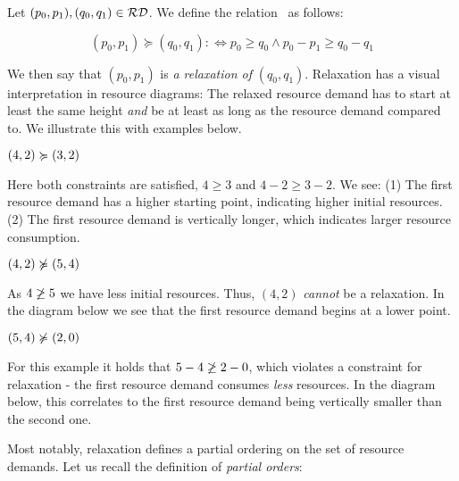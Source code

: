 \begin{definition}[Relaxation]\label{def:relaxation}
   Let \((p_0, p_1), (q_0, q_1) \in \mathcal{RD}\). We define the relation \relaxation ~as follows:

   \[
      (p_0, p_1) \succcurlyeq (q_0, q_1) :\iff p_0 \geq q_0 \wedge p_0 - p_1 \geq q_0 - q_1
   \]
\end{definition}

We then say that \((p_0, p_1)\) is \emph{a relaxation of} \((q_0, q_1)\). Relaxation has a visual interpretation in resource diagrams: The relaxed resource demand has to start at least the same height \emph{and} be at least as long as the resource demand compared to. We illustrate this with examples below.

\begin{example}
   \((4, 2) \succcurlyeq (3, 2)\)

Here both constraints are satisfied, \(4 \geq 3\) and \(4 - 2 \geq 3 - 2\). We see: (1) The first resource demand has a higher starting point, indicating higher initial resources. (2) The first resource demand is vertically longer, which indicates larger resource consumption.


\end{example}

\begin{example}
   \((4,2) \notrelaxation (5, 4)\)

As \(4 \centernot{\geq} 5\) we have less initial resources. Thus, \((4,2)\) \emph{cannot} be a relaxation. In the diagram below we see that the first resource demand begins at a lower point.


\end{example}

\begin{example}
   \((5, 4) \notrelaxation (2, 0)\)

For this example it holds that \(5 - 4 \centernot{\geq} 2 - 0\), which violates a constraint for relaxation - the first resource demand consumes \emph{less} resources. In the diagram below, this correlates to the first resource demand being vertically smaller than the second one.


\end{example}

Most notably, relaxation defines a partial ordering on the set of resource demands. Let us recall the definition of \emph{partial orders}:

